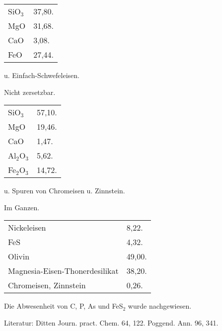 \documentclass[a4paper, 11pt, oneside]{article}
\begin{document}
\begin{table}[H]
    \centering\swabfamily\Large
    \begin{tabular}{l l}
        SiO$_{3}$ & 37,80. \\
        MgO & 31,68. \\
        CaO & 3,08. \\
        FeO & 27,44. \\ 
    \end{tabular}
\end{table}
 
u. Einfach-Schwefeleisen.

\begin{center}
Nicht zersetzbar.
\end{center}

\begin{table}[H]
    \centering\swabfamily\Large
    \begin{tabular}{l l}
        SiO$_{3}$ & 57,10. \\
        MgO & 19,46. \\
        CaO & 1,47. \\
        Al$_{2}$O$_{3}$ & 5,62. \\
        Fe$_{2}$O$_{3}$ & 14,72. \\
    \end{tabular}
\end{table}

u. Spuren von Chromeisen u. Zinnstein.

\begin{center}
Im Ganzen.
\end{center}

\begin{table}[H]
    \centering\swabfamily\Large
    \begin{tabular}{l l}
        Nickeleisen & 8,22. \\
        FeS & 4,32. \\
        Olivin & 49,00. \\
        Magnesia-Eisen-Thonerdesilikat & 38,20. \\
        Chromeisen, Zinnstein & 0,26. \\
    \end{tabular}
\end{table}

Die Abwesenheit von C, P, As und FeS$_{2}$ wurde nachgewiesen.

\normalsize
Literatur: Ditten Journ. pract. Chem. 64, 122. Poggend. Ann. 96, 341.
\end{document}
